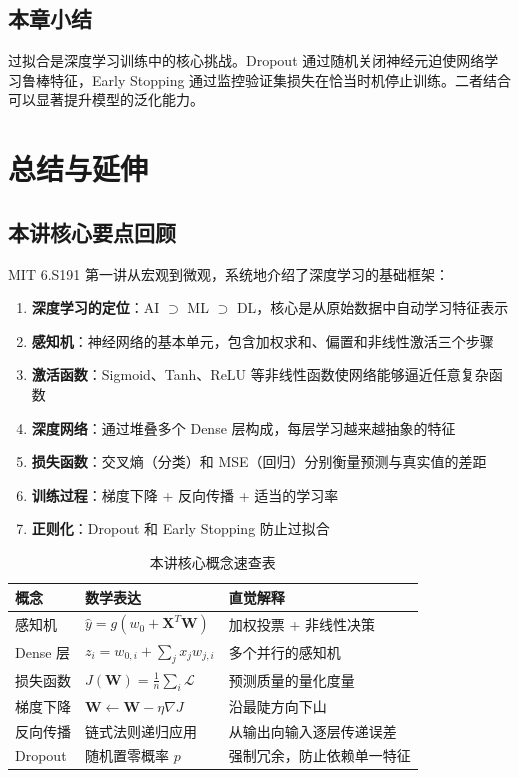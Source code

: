 \documentclass[a4paper]{article}
\begin{document}
\subsection{本章小结}

过拟合是深度学习训练中的核心挑战。Dropout 通过随机关闭神经元迫使网络学习鲁棒特征，Early Stopping 通过监控验证集损失在恰当时机停止训练。二者结合可以显著提升模型的泛化能力。

\section{总结与延伸}

\subsection{本讲核心要点回顾}

MIT 6.S191 第一讲从宏观到微观，系统地介绍了深度学习的基础框架：

\begin{enumerate}
\item \textbf{深度学习的定位}：AI $\supset$ ML $\supset$ DL，核心是从原始数据中自动学习特征表示
\item \textbf{感知机}：神经网络的基本单元，包含加权求和、偏置和非线性激活三个步骤
\item \textbf{激活函数}：Sigmoid、Tanh、ReLU 等非线性函数使网络能够逼近任意复杂函数
\item \textbf{深度网络}：通过堆叠多个 Dense 层构成，每层学习越来越抽象的特征
\item \textbf{损失函数}：交叉熵（分类）和 MSE（回归）分别衡量预测与真实值的差距
\item \textbf{训练过程}：梯度下降 + 反向传播 + 适当的学习率
\item \textbf{正则化}：Dropout 和 Early Stopping 防止过拟合
\end{enumerate}

\begin{table}[H]
\centering
\begin{tabular}{lp{5cm}p{5cm}}
\toprule
\textbf{概念} & \textbf{数学表达} & \textbf{直觉解释} \\
\midrule
感知机 & $\hat{y} = g(w_0 + \mathbf{X}^T\mathbf{W})$ & 加权投票 + 非线性决策 \\
Dense 层 & $z_i = w_{0,i} + \sum_j x_j w_{j,i}$ & 多个并行的感知机 \\
损失函数 & $J(\mathbf{W}) = \frac{1}{n}\sum_i \mathcal{L}$ & 预测质量的量化度量 \\
梯度下降 & $\mathbf{W} \leftarrow \mathbf{W} - \eta \nabla J$ & 沿最陡方向下山 \\
反向传播 & 链式法则递归应用 & 从输出向输入逐层传递误差 \\
Dropout & 随机置零概率 $p$ & 强制冗余，防止依赖单一特征 \\
\bottomrule
\end{tabular}
\caption{本讲核心概念速查表}
\end{table}
\end{document}
